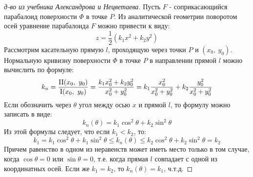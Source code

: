 \documentclass[main]{subfiles}
\begin{document}
    \begin{proof}[д-во из учебника Александрова и Нецветаева]
        Пусть $F$ - соприкасающийся парабалоид поверхности $\Phi$ в точке $P$. Из аналитической геометрии поворотом осей уравнение парабалоида $F$ можно привести к виду:
        \[z = \frac{1}{2}(k_1 x^2 + k_2 y^2)\]
        Рассмотрим касательную прямую $l$, проходящую  через точки $P$ и $(x_0,\ y_0)$. Нормальную кривизну поверхности $\Phi$ в точке $P$ в направлении прямой $l$ можно вычислить по формуле:
        \[k_n = \frac{\RNumb{2}(x_0,\ y_0)}{\RNumb{1}(x_0,\ y_0)} = \frac{k_1 x_0^2 + k_2 y_0^2}{x_0^2 + y_0^2} = k_1 \frac{x_0^2}{x_0^2 + y_0^2} + k_2 \frac{y_0^2}{x_0^2 + y_0^2}\]
        Если обозначить через $\theta$ угол между осью $x$ и прямой $l$, то формулу можно записать в виде:
        \[k_n(\theta) = k_1 \cos^2 \theta + k_2 \sin^2 \theta\]
        Из этой формулы следует, что если $k_1 < k_2$, то:
        \[k_1 = k_1 \cos^2 \theta + k_1 \sin^2 \theta \leq k_n(\theta) \leq k_2 \cos^2 \theta + k_2 \sin^2 \theta = k_2\]
        Причем равенство в одном из неравенств может иметь место только в том случае, когда $\cos \theta = 0$ или $\sin \theta = 0$, т.е. когда прямая $l$ совпадает с одной из координатных осей. Если же $k_1 = k_2$, то $k_n(\theta) = k_1$, ч.т.д.
    \end{proof}
\end{document}
